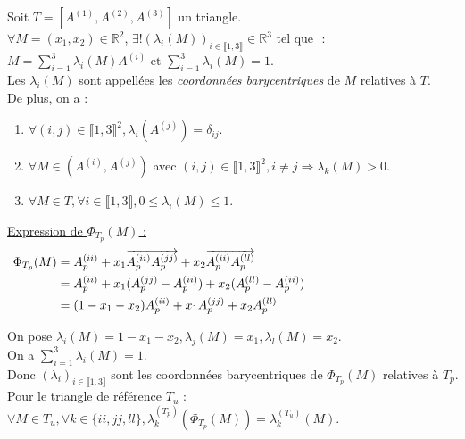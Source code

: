 \documentclass[12pt,a4paper]{article}
\newcommand{\definition}[2]{%
    \begin{tcolorbox}[colback=white,colframe=blue!25!white,title=\textbf{Définition #1}, coltitle=black]
        #2
    \end{tcolorbox}
}
\begin{document}
\definition{- Coordonnées barycentriques relatives à un triangle}{
    Soit $T = [A^{(1)}, A^{(2)}, A^{(3)}]$ un triangle. \\
    $\forall M = (x_1, x_2) \in \mathbb{R}^2$, $\exists! (\lambda_i(M))_{i \in \llbracket 1, 3 \rrbracket} \in \mathbb{R}^3 \text{ tel que }$ : \\
    $M = \sum_{i=1}^3 \lambda_i(M) A^{(i)} \text{ et } \sum_{i=1}^3 \lambda_i(M) = 1$. \\

    Les $\lambda_i(M)$ sont appellées les \textit{coordonnées barycentriques} de $M$ relatives à $T$. \\

    De plus, on a :
    \begin{enumerate}[label=\roman*)]
        \item $\forall (i, j) \in \llbracket 1, 3 \rrbracket^2, \lambda_i(A^{(j)}) = \delta_{ij}$.
        \item $\forall M \in (A^{(i)}, A^{(j)})$ avec $(i, j) \in \llbracket 1, 3 \rrbracket^2, i \neq j \Rightarrow \lambda_k(M) > 0$.
        \item $\forall M \in T, \forall i \in \llbracket 1, 3 \rrbracket, 0 \leq \lambda_i(M) \leq 1$.
    \end{enumerate}
}


\underline{Expression de $\Phi_{T_p}(M)$ :}
\begin{align*}
    \Phi_{T_p}(M) &= A_p^{(ii)} + x_1 \overrightarrow{A_p^{(ii)} A_p^{(jj)}} + x_2 \overrightarrow{A_p^{(ii)} A_p^{(ll)}} \hspace{14.5cm} \\
    &= A_p^{(ii)} + x_1 (A_p^{(jj)} - A_p^{(ii)}) + x_2 (A_p^{(ll)} - A_p^{(ii)}) \\
    &= (1 - x_1 - x_2) A_p^{(ii)} + x_1 A_p^{(jj)} + x_2 A_p^{(ll)}
\end{align*}

On pose $\lambda_i(M) = 1 - x_1 - x_2, \lambda_j(M) = x_1, \lambda_l(M) = x_2$. \\
On a $\sum_{i=1}^3 \lambda_i(M) = 1$. \\
Donc $(\lambda_i)_{i \in \llbracket 1, 3 \rrbracket}$ sont les coordonnées barycentriques de $\Phi_{T_p}(M)$ relatives à $T_p$. \\

Pour le triangle de référence $T_u$ : \\
$\forall M \in T_u, \forall k \in \{ii, jj, ll\}, \lambda_k^{(T_p)}(\Phi_{T_p}(M)) = \lambda_k^{(T_u)}(M)$. \\
\end{document}
